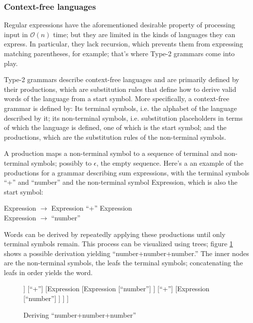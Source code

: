 			
			\subsubsection{Context-free languages}
			
			Regular expressions have the aforementioned desirable property of processing input in $\mathcal{O}(n)$ time; but they are limited in the kinds of languages they can express. In particular, they lack recursion, which prevents them from expressing matching parentheses, for example; that's where Type-2 grammars come into play.
			
			Type-2 grammars describe context-free languages and are primarily defined by their productions, which are substitution rules that define how to derive valid words of the language from a start symbol. More specifically, a context-free grammar is defined by: Its terminal symbols, i.e. the alphabet of the language described by it; its non-terminal symbols, i.e. substitution placeholders in terms of which the language is defined, one of which is the start symbol; and the productions, which are the substitution rules of the non-terminal symbols.
			
			A production maps a non-terminal symbol to a sequence of terminal and non-terminal symbols; possibly to $\epsilon$, the empty sequence. Here's a an example of the productions for a grammar describing sum expressions, with the terminal symbols ``+'' and ``number'' and the non-terminal symbol Expression, which is also the start symbol:
			
			Expression $\rightarrow$ Expression ``+'' Expression\\
			Expression $\rightarrow$ ``number''
			
			Words can be derived by repeatedly applying these productions until only terminal symbols remain. This process can be visualized using trees; figure \ref{fig:derivation_tree_exp_1} shows a possible derivation yielding ``number+number+number.'' The inner nodes are the non-terminal symbols, the leafs the terminal symbols; concatenating the leafs in order yields the word.
			
			\begin{figure}
			\centering
			\begin{forest}
			[Expression
				[Expression
					[``number'']
				]
				[``+'']
				[Expression
					[Expression
						[``number'']
					]
					[``+'']
					[Expression
						[``number'']
					]
				]
			]
			\end{forest}
			\caption{Deriving ``number+number+number''}
			\label{fig:derivation_tree_exp_1}
			\end{figure}
			
